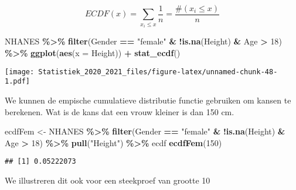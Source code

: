 \documentclass[
  12pt,dutch,coursenotes]{book}
\newenvironment{Shaded}{\begin{snugshade}}{\end{snugshade}}
\newcommand{\DataTypeTok}[1]{\textcolor[rgb]{0.13,0.29,0.53}{#1}}
\newcommand{\DecValTok}[1]{\textcolor[rgb]{0.00,0.00,0.81}{#1}}
\newcommand{\KeywordTok}[1]{\textcolor[rgb]{0.13,0.29,0.53}{\textbf{#1}}}
\newcommand{\NormalTok}[1]{#1}
\newcommand{\OperatorTok}[1]{\textcolor[rgb]{0.81,0.36,0.00}{\textbf{#1}}}
\newcommand{\StringTok}[1]{\textcolor[rgb]{0.31,0.60,0.02}{#1}}
\theoremstyle{definition}
\theoremstyle{definition}
\theoremstyle{definition}
\theoremstyle{remark}
\begin{document}
\[ECDF(x) = \sum\limits_{x_i \leq x} \frac{1}{n} = \frac{\# (x_i \leq x)}{n}\]

\begin{Shaded}
\begin{Highlighting}[]
\NormalTok{NHANES }\OperatorTok{\%\textgreater{}\%}\StringTok{ }\KeywordTok{filter}\NormalTok{(Gender }\OperatorTok{==}\StringTok{ "female"} \OperatorTok{\&}\StringTok{ }\OperatorTok{!}\KeywordTok{is.na}\NormalTok{(Height) }\OperatorTok{\&}\StringTok{ }
\StringTok{    }\NormalTok{Age }\OperatorTok{\textgreater{}}\StringTok{ }\DecValTok{18}\NormalTok{) }\OperatorTok{\%\textgreater{}\%}\StringTok{ }\KeywordTok{ggplot}\NormalTok{(}\KeywordTok{aes}\NormalTok{(}\DataTypeTok{x =}\NormalTok{ Height)) }\OperatorTok{+}\StringTok{ }\KeywordTok{stat\_ecdf}\NormalTok{()}
\end{Highlighting}
\end{Shaded}

\texttt{[image: Statistiek\_2020\_2021\_files/figure-latex/unnamed-chunk-48-1.pdf]}

We kunnen de empische cumulatieve distributie functie gebruiken om kansen te berekenen.
Wat is de kans dat een vrouw kleiner is dan 150 cm.

\begin{Shaded}
\begin{Highlighting}[]
\NormalTok{ecdfFem \textless{}{-}}\StringTok{ }\NormalTok{NHANES }\OperatorTok{\%\textgreater{}\%}\StringTok{ }\KeywordTok{filter}\NormalTok{(Gender }\OperatorTok{==}\StringTok{ "female"} \OperatorTok{\&}\StringTok{ }\OperatorTok{!}\KeywordTok{is.na}\NormalTok{(Height) }\OperatorTok{\&}\StringTok{ }
\StringTok{    }\NormalTok{Age }\OperatorTok{\textgreater{}}\StringTok{ }\DecValTok{18}\NormalTok{) }\OperatorTok{\%\textgreater{}\%}\StringTok{ }\KeywordTok{pull}\NormalTok{(}\StringTok{"Height"}\NormalTok{) }\OperatorTok{\%\textgreater{}\%}\StringTok{ }\NormalTok{ecdf}
\KeywordTok{ecdfFem}\NormalTok{(}\DecValTok{150}\NormalTok{)}
\end{Highlighting}
\end{Shaded}

\begin{verbatim}
## [1] 0.05222073
\end{verbatim}

We illustreren dit ook voor een steekproef van grootte 10
\end{document}
